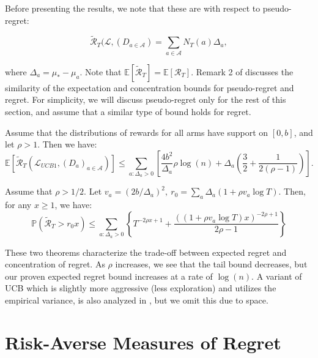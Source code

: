 \documentclass[11pt]{article}
\begin{document}
Before presenting the results, we note that these are with respect to pseudo-regret:

\begin{equation}
\tilde{\mathcal{R}}_T(\mathcal{L}, (D_{a \in \mathcal{A}}) = \sum_{a \in \mathcal{A}} N_T(a) \Delta_a,
\end{equation}

where $\Delta_a = \mu_{*} - \mu_a$. Note that $\mathbb{E}[\tilde{\mathcal{R}}_T] = \mathbb{E}[\mathcal{R}_T]$. Remark 2 of \cite{audibert2009exploration} discusses the similarity of the expectation and concentration bounds for pseudo-regret and regret. For simplicity, we will discuss pseudo-regret only for the rest of this section, and assume that a similar type of bound holds for regret.

\begin{theorem}
Assume that the distributions of rewards for all arms have support on $[0, b]$, and let $\rho > 1$. Then we have:
\begin{equation}
\mathbb{E}[\tilde{\mathcal{R}}_T(\mathcal{L}_{UCB1}, (D_a)_{a \in \mathcal{A}})] \le \sum_{a: \Delta_a > 0} \left[ \frac{4b^2}{\Delta_a} \rho \log (n) + \Delta_a \left( \frac{3}{2} + \frac{1}{2(\rho - 1)} \right)\right] .
\end{equation}
\end{theorem}

\begin{theorem}
Assume that $\rho > 1/2$. Let $v_a = (2b/ \Delta_a)^2,~r_0 = \sum_a \Delta_a (1 + \rho v_a \log T)$. Then, for any $x \ge 1$, we have:
\begin{equation}
\mathbb{P}(\tilde{\mathcal{R}}_T > r_0x) \le \sum_{a: \Delta_a > 0} \left\{ T^{-2 \rho x + 1} + \frac{((1 + \rho v_a \log T)x)^{-2 \rho + 1}}{2 \rho - 1}\right\}
\end{equation}
\end{theorem}

These two theorems characterize the trade-off between expected regret and concentration of regret. As $\rho$ increases, we see that the tail bound decreases, but our proven expected regret bound increases at a rate of $\log(n)$. A variant of UCB which is slightly more aggressive (less exploration) and utilizes the empirical variance, is also analyzed in \cite{audibert2009exploration}, but we omit this due to space.




\section{Risk-Averse Measures of Regret}
\end{document}
